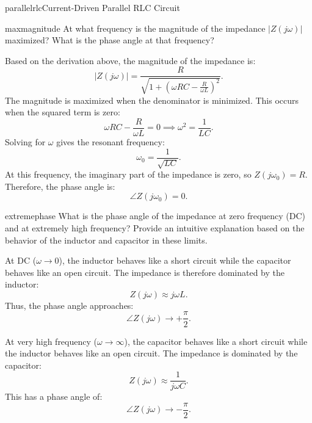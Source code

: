 \begin{mainquestion}{parallelrlc}{Current-Driven Parallel RLC Circuit}
\begin{partquestion}{maxmagnitude}
{At what frequency is the magnitude of the impedance $|Z(j\omega)|$ maximized?  
What is the phase angle at that frequency?}

\begin{answer}[3in]
Based on the derivation above, the magnitude of the impedance is:
\[
|Z(j\omega)| = \frac{R}{\sqrt{1 + \left(\omega RC - \frac{R}{\omega L}\right)^2}}.
\]
The magnitude is maximized when the denominator is minimized. This occurs when the squared term is zero:
\[
\omega RC - \frac{R}{\omega L} = 0 \implies \omega^2 = \frac{1}{LC}.
\]
Solving for $\omega$ gives the resonant frequency:
\[
\omega_0 = \frac{1}{\sqrt{LC}}.
\]
At this frequency, the imaginary part of the impedance is zero, so $Z(j\omega_0) = R$. Therefore, the phase angle is:
\[
\angle Z(j\omega_0) = 0.
\]
\end{answer}

\end{partquestion}

\begin{partquestion}{extremephase}
{What is the phase angle of the impedance at zero frequency (DC) and at extremely high frequency?  
Provide an intuitive explanation based on the behavior of the inductor and capacitor in these limits.}

\begin{answer}[3.5in]
At DC ($\omega \to 0$), the inductor behaves like a short circuit while the capacitor behaves like an open circuit. The impedance is therefore dominated by the inductor:
\[
Z(j\omega) \approx j\omega L.
\]
Thus, the phase angle approaches:
\[
\angle Z(j\omega) \to +\frac{\pi}{2}.
\]

At very high frequency ($\omega \to \infty$), the capacitor behaves like a short circuit while the inductor behaves like an open circuit. The impedance is dominated by the capacitor:
\[
Z(j\omega) \approx \frac{1}{j\omega C}.
\]
This has a phase angle of:
\[
\angle Z(j\omega) \to -\frac{\pi}{2}.
\]
\end{answer}

\end{partquestion}

\end{mainquestion}
